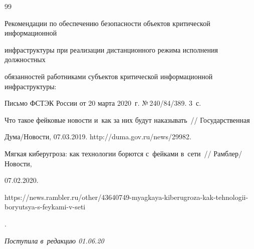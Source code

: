 {{\begin{thebibliography}{99}


Рекомендации по обеспечению безопасности объектов критической информационной 


инфраструктуры при реализации дистанционного режима исполнения должностных 


обязанностей работниками субъектов критической информационной инфраструктуры: 


Письмо ФСТЭК России от 20 марта 2020~г. №\,240/84/389. 3~с.







Что такое фейковые новости и~как за них будут наказывать~/\!\!/ Государственная 


Дума/Новости, 07.03.2019. {\sf http://duma.gov.ru/news/29982}.




Мягкая киберугроза: как технологии борются с~фейками в~сети~/\!\!/ Рамблер\!/\!Новости, 


07.02.2020. {\sf  


https://news.rambler.ru/other/43640749-myagkaya-kiberugroza-kak-tehnologii-boryutsya-s-feykami-v-seti}. 








    \end{thebibliography}


} }








\vspace*{-3pt}





\hfill{\small\textit{Поступила в~редакцию 01.06.20}}





























